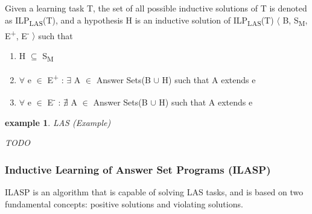 \documentclass[12pt,twoside]{report}
\newtheorem{examp}{example}[section]
\begin{document}
Given a learning task T, the set of all possible inductive solutions of T is denoted as ILP\textsubscript{LAS}(T), and a hypothesis H is an inductive solution of ILP\textsubscript{LAS}(T) $\langle$ B, S\textsubscript{M}, E\textsuperscript{+}, E\textsuperscript{-} $\rangle$ such that
\begin{enumerate}
\item H $\subseteq$ S\textsubscript{M}
\item $\forall$ e $\in$ E\textsuperscript{+} : $\exists$ A $\in$ Answer Sets(B $\cup$ H) such that A extends e
\item $\forall$ e $\in$ E\textsuperscript{-} : $\nexists$ A $\in$ Answer Sets(B $\cup$ H) such that A extends e
\end{enumerate}


\begin{examp} \normalfont LAS (Example)

TODO

\end{examp}
\label{las_example}


\subsubsection{Inductive Learning of Answer Set Programs (ILASP)}

ILASP is an algorithm that is capable of solving LAS tasks, and is based on two fundamental concepts: positive solutions and violating solutions.
\end{document}

